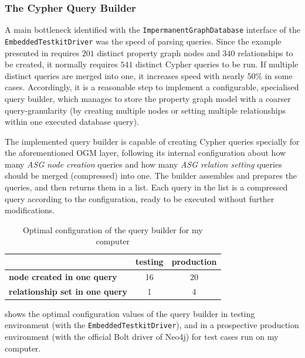 \subsubsection{The Cypher Query Builder}

A main bottleneck identified with the \texttt{ImpermanentGraphDatabase} interface of the \texttt{EmbeddedTestkitDriver} was the speed of parsing queries. Since the example presented in  requires $201$ distinct property graph nodes and $340$ relationships to be created, it normally requires $541$ distinct Cypher queries to be run. If multiple distinct queries are merged into one, it increases speed with nearly 50\% in some cases. Accordingly, it is a reasonable step to implement a configurable, specialised query builder, which manages to store the property graph model with a coarser query-granularity (by creating multiple nodes or setting multiple relationships within one executed database query).

The implemented query builder is capable of creating Cypher queries specially for the aforementioned OGM layer, following its internal configuration about how many \emph{ASG node creation} queries and how many \emph{ASG relation setting} queries should be merged (compressed) into one. The builder assembles and prepares the queries, and then returns them in a list. Each query in the list is a compressed query according to the configuration, ready to be executed without further modifications.

\begin{table}[!htb]
	\centering
	\begin{tabular}{l|cc}
		\toprule
																								&   \textbf{testing}   &   \textbf{production}   \\
		\midrule
		\textbf{node created in one query}          &   16                 &   20                    \\
		\textbf{relationship set in one query}      &   1                  &   4                     \\
		\bottomrule
	\end{tabular}

	\caption{Optimal configuration of the query builder for my computer}
	\label{table:query-builder-config}
\end{table}

 shows the optimal configuration values of the query builder in testing environment (with the \texttt{EmbeddedTestkitDriver}), and in a prospective production environment (with the official Bolt driver of Neo4j) for test cases run on my computer.


